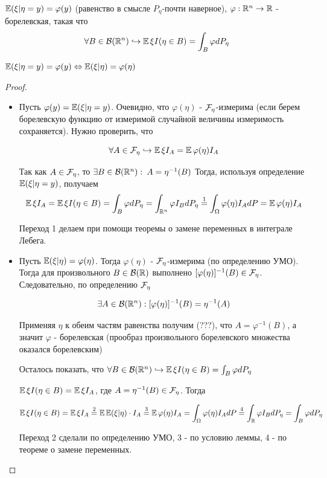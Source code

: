 \begin{definition}
    \( \operatorname{\mathbb{E}}(\xi | \eta=y)=\varphi(y) \) (равенство в смысле $P_\eta$-почти наверное), $\varphi: \mathbb{R}^n \rightarrow \mathbb{R}$ - борелевская, такая что 
    \[ \forall B \in \mathcal{B}(\mathbb{R}^n) \hookrightarrow \operatorname{\mathbb{E}} \xi I(\eta \in B)=\int_B \varphi dP_\eta \]
\end{definition}

\begin{lemmanote}
    \( \operatorname{\mathbb{E}}(\xi | \eta = y)=\varphi(y) \Leftrightarrow \operatorname{\mathbb{E}}(\xi | \eta)=\varphi(\eta) \)
\end{lemmanote}

\begin{proof}
    \begin{itemize}
        \item[$\Rightarrow$:] Пусть $\varphi(y)=\operatorname{\mathbb{E}}(\xi | \eta = y)$. Очевидно, что $\varphi(\eta)$ - $\mathcal{F}_\eta$-измерима (если берем борелевскую функцию от измеримой случайной величины измеримость сохраняется). Нужно проверить, что 
        
        \[ \forall A \in \mathcal{F}_\eta \hookrightarrow \operatorname{\mathbb{E}} \xi I_A = \operatorname{\mathbb{E}} \varphi(\eta) I_A \]
    
        Так как $A \in \mathcal{F}_\eta$, то $\exists B \in \mathcal{B}(\mathbb{R}^n): \: A=\eta^{-1}(B)$ Тогда, используя определение $\operatorname{\mathbb{E}}(\xi | \eta = y)$, получаем
         \[ \operatorname{\mathbb{E}} \xi I_A = \operatorname{\mathbb{E}} \xi I(\eta \in B)=\int_B \varphi dP_\eta = \int_{\mathbb{R}^n} \varphi I_B dP_\eta \stackrel{1}{=} \int_\Omega \varphi(\eta) I_A dP = \operatorname{\mathbb{E}} \varphi(\eta) I_A \]
    
        Переход 1 делаем при помощи теоремы о замене переменных в интеграле Лебега.
        
        \item[$\Leftarrow$:] Пусть $\operatorname{\mathbb{E}}(\xi|\eta)=\varphi(\eta)$. Тогда $\varphi(\eta)$ - $\mathcal{F}_\eta$-измерима (по определению УМО). Тогда для произвольного $B \in \mathcal{B}(\mathbb{R})$ выполнено $[\varphi(\eta)]^{-1}(B) \in \mathcal{F}_\eta$. Следовательно, по определению $\mathcal{F}_\eta$ 
        
        \[ \exists A \in \mathcal{B}(\mathbb{R}^n): [\varphi(\eta)]^{-1}(B)=\eta^{-1}(A) \]
        
        Применяя $\eta$ к обеим частям равенства получим (???), что $A = \varphi^{-1}(B)$, а значит $\varphi$ - борелевская (прообраз произвольного борелевского множества оказался борелевским)
        
        Осталось показать, что \( \forall B \in \mathcal{B}(\mathbb{R}^n) \hookrightarrow \operatorname{\mathbb{E}} \xi I(\eta \in B)=\int_B \varphi dP_\eta \)
        
        \( \operatorname{\mathbb{E}} \xi I(\eta \in B)=\operatorname{\mathbb{E}} \xi I_A \), где \( A = \eta^{-1}(B) \in \mathcal{F}_\eta \). Тогда
        
        \[ \operatorname{\mathbb{E}} \xi I(\eta \in B)=\operatorname{\mathbb{E}} \xi I_A\stackrel{2}{=}\operatorname{\mathbb{E}}\operatorname{\mathbb{E}}(\xi | \eta) \cdot I_A\stackrel{3}{=} \operatorname{\mathbb{E}}\varphi(\eta) I_A = \int_\Omega \varphi(\eta) I_A dP \stackrel{4}{=} \int_{\mathbb{R}} \varphi I_B dP_\eta = \int_B \varphi dP_\eta \]
        
        Переход 2 сделали по определению УМО, 3 - по условию леммы, 4 - по теореме о замене переменных.
    \end{itemize} 
\end{proof}

